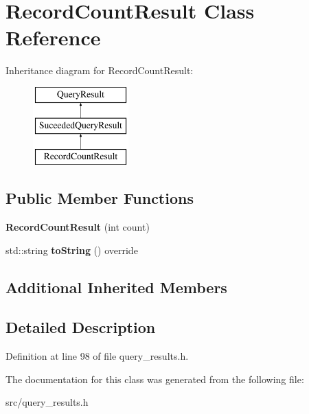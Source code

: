 \hypertarget{class_record_count_result}{}\section{Record\+Count\+Result Class Reference}
\label{class_record_count_result}
Inheritance diagram for Record\+Count\+Result\+:\begin{figure}[H]
\begin{center}
\leavevmode
\includegraphics[height=3.000000cm]{class_record_count_result}
\end{center}
\end{figure}
\subsection*{Public Member Functions}
\begin{DoxyCompactItemize}
\item 
\mbox{\label{class_record_count_result_aff9926d0e43cd36f44bf306bd80f7f00}} 
{\bfseries Record\+Count\+Result} (int count)
\item 
\mbox{\label{class_record_count_result_a6d29eca18107e0ef190e458d714c011e}} 
std\+::string {\bfseries to\+String} () override
\end{DoxyCompactItemize}
\subsection*{Additional Inherited Members}


\subsection{Detailed Description}


Definition at line 98 of file query\+\_\+results.\+h.



The documentation for this class was generated from the following file\+:\begin{DoxyCompactItemize}
\item 
src/query\+\_\+results.\+h\end{DoxyCompactItemize}
